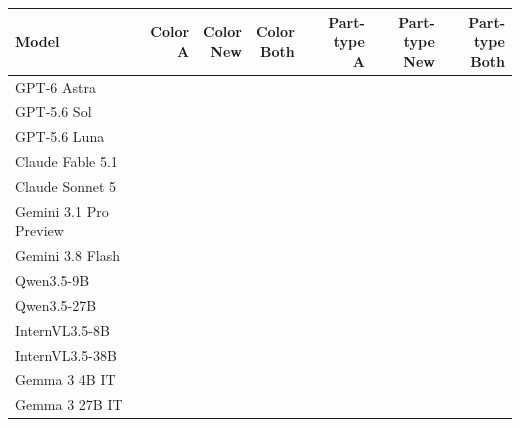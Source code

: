 \begin{tabular}{@{}lrrrrrr@{}}
\toprule
Model & \shortstack{Color\\A} & \shortstack{Color\\New} & \shortstack{Color\\Both} & \shortstack{Part-type\\A} & \shortstack{Part-type\\New} & \shortstack{Part-type\\Both}\\
\midrule
GPT-6 Astra &  &  &  &  &  & \\
GPT-5.6 Sol &  &  &  &  &  & \\
GPT-5.6 Luna &  &  &  &  &  & \\
Claude Fable 5.1 &  &  &  &  &  & \\
Claude Sonnet 5 &  &  &  &  &  & \\
Gemini 3.1 Pro Preview &  &  &  &  &  & \\
Gemini 3.8 Flash &  &  &  &  &  & \\
Qwen3.5-9B &  &  &  &  &  & \\
Qwen3.5-27B &  &  &  &  &  & \\
InternVL3.5-8B &  &  &  &  &  & \\
InternVL3.5-38B &  &  &  &  &  & \\
Gemma 3 4B IT &  &  &  &  &  & \\
Gemma 3 27B IT &  &  &  &  &  & \\
\bottomrule
\end{tabular}
